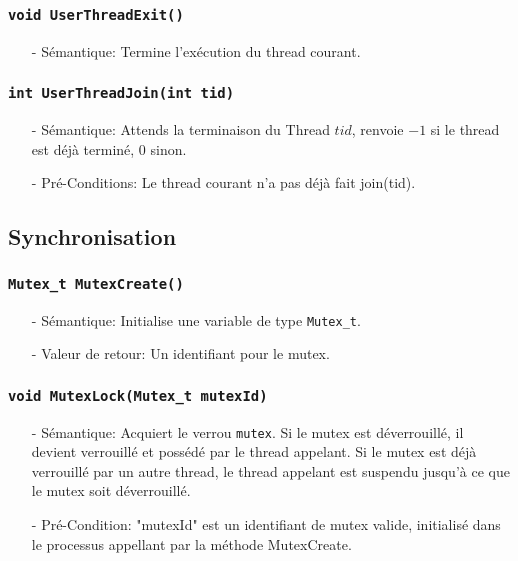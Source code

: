 \documentclass[11pt]{article}
\begin{document}
\subsubsection{\texttt{void UserThreadExit()}}
\begin{itemize}
\item[-] Sémantique: Termine l'exécution du thread courant.
\end{itemize}

\subsubsection{\texttt{int UserThreadJoin(int tid)}}
\begin{itemize}
\item[-] Sémantique: Attends la terminaison du Thread $tid$, renvoie $-1$
  si le thread est déjà terminé, $0$ sinon.
\item[-] Pré-Conditions: Le thread courant n'a pas déjà fait join(tid). 
\end{itemize}

\subsection{Synchronisation}
\subsubsection{\texttt{Mutex\_t MutexCreate()}}
\begin{itemize}
\item[-]Sémantique: Initialise une variable de type \texttt{Mutex\_t}.
\item[-]Valeur de retour: Un identifiant pour le mutex.
\end{itemize}

\subsubsection{\texttt{void MutexLock(Mutex\_t mutexId)}}
\begin{itemize}
\item[-]Sémantique: Acquiert le verrou \texttt{mutex}. Si le mutex est déverrouillé, il devient verrouillé
  et possédé par le thread appelant. Si le mutex est déjà verrouillé par un autre thread,
  le thread appelant est suspendu jusqu'à ce que le mutex soit déverrouillé.
\item[-]Pré-Condition: "mutexId" est un identifiant de mutex valide, initialisé dans le processus
  appellant par la méthode MutexCreate.
\end{itemize}
\end{document}
